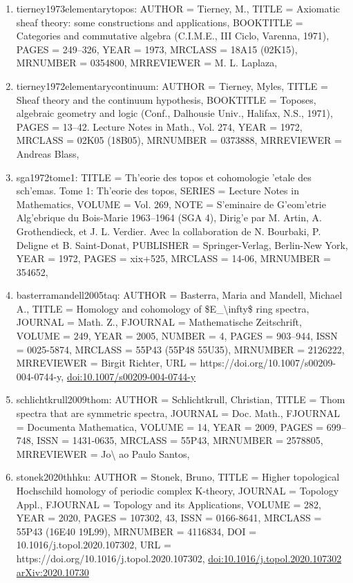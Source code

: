 \documentclass[11pt]{article}
\begin{document}
\begin{enumerate}[leftmargin=*]
  \item tierney1973elementarytopos: AUTHOR = Tierney, M., TITLE = Axiomatic sheaf theory: some constructions and applications, BOOKTITLE = Categories and commutative algebra (C.I.M.E., III Ciclo, Varenna, 1971), PAGES = 249--326, YEAR = 1973, MRCLASS = 18A15 (02K15), MRNUMBER = 0354800, MRREVIEWER = M. L. Laplaza,
  \item tierney1972elementarycontinuum: AUTHOR = Tierney, Myles, TITLE = Sheaf theory and the continuum hypothesis, BOOKTITLE = Toposes, algebraic geometry and logic (Conf., Dalhousie Univ., Halifax, N.S., 1971), PAGES = 13--42. Lecture Notes in Math., Vol. 274, YEAR = 1972, MRCLASS = 02K05 (18B05), MRNUMBER = 0373888, MRREVIEWER = Andreas Blass,
  \item sga1972tome1: TITLE = Th'eorie des topos et cohomologie 'etale des sch'emas. Tome 1: Th'eorie des topos, SERIES = Lecture Notes in Mathematics, VOLUME = Vol. 269, NOTE = S'eminaire de G'eom'etrie Alg'ebrique du Bois-Marie 1963--1964 (SGA 4), Dirig'e par M. Artin, A. Grothendieck, et J. L. Verdier. Avec la collaboration de N. Bourbaki, P. Deligne et B. Saint-Donat, PUBLISHER = Springer-Verlag, Berlin-New York, YEAR = 1972, PAGES = xix+525, MRCLASS = 14-06, MRNUMBER = 354652,
  \item basterramandell2005taq: AUTHOR = Basterra, Maria and Mandell, Michael A., TITLE = Homology and cohomology of \$E\_\textbackslash{}infty\$ ring spectra, JOURNAL = Math. Z., FJOURNAL = Mathematische Zeitschrift, VOLUME = 249, YEAR = 2005, NUMBER = 4, PAGES = 903--944, ISSN = 0025-5874, MRCLASS = 55P43 (55P48 55U35), MRNUMBER = 2126222, MRREVIEWER = Birgit Richter, URL = https://doi.org/10.1007/s00209-004-0744-y, \href{https://doi.org/10.1007/s00209-004-0744-y}{doi:10.1007/s00209-004-0744-y}
  \item schlichtkrull2009thom: AUTHOR = Schlichtkrull, Christian, TITLE = Thom spectra that are symmetric spectra, JOURNAL = Doc. Math., FJOURNAL = Documenta Mathematica, VOLUME = 14, YEAR = 2009, PAGES = 699--748, ISSN = 1431-0635, MRCLASS = 55P43, MRNUMBER = 2578805, MRREVIEWER = Jo\textbackslash{} ao Paulo Santos,
  \item stonek2020thhku: AUTHOR = Stonek, Bruno, TITLE = Higher topological Hochschild homology of periodic complex K-theory, JOURNAL = Topology Appl., FJOURNAL = Topology and its Applications, VOLUME = 282, YEAR = 2020, PAGES = 107302, 43, ISSN = 0166-8641, MRCLASS = 55P43 (16E40 19L99), MRNUMBER = 4116834, DOI = 10.1016/j.topol.2020.107302, URL = https://doi.org/10.1016/j.topol.2020.107302, \href{https://doi.org/10.1016/j.topol.2020.107302}{doi:10.1016/j.topol.2020.107302} \href{https://arxiv.org/abs/2020.10730}{arXiv:2020.10730}

\end{enumerate}
\end{document}

